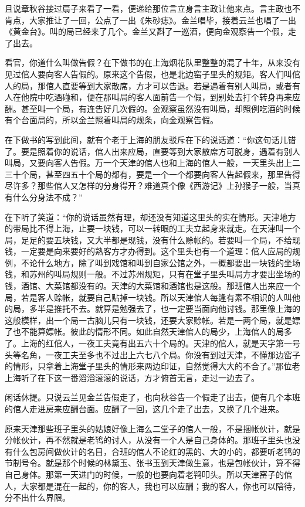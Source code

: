 \documentclass[12pt,UTF8]{ctexbook}
\begin{document}
{{{且说章秋谷接过扇子来看了一看，便递给那位言立身言主政让他来点。言主政也不肯点，大家推让了一回，公点了一出《朱砂痣》。金兰唱毕，接着云兰也唱了一出《黄金台》。叫的局已经来了几个。金兰又斟了一巡酒，便向金观察告一个假，走了出去。

看官，你道什么叫做告假？在下做书的在上海烟花队里整整的混了十年，从来没有见过倌人要向客人告假的。原来这个告假，也是北边窑子里头的规矩。客人们叫倌人的局，那倌人直要等到大家散席，方才可以告退。若是遇着有别人叫局，或者有人在他院中吃酒碰和，便在那叫局的客人面前告一个假，到别处去打个转身再来应酬。甚至叫一个局，有连告好几次假的。金观察虽然没有叫局，却照例吃酒的时候有个台面局的，所以金兰照着叫局的规条，向金观察告假。

在下做书的写到此间，就有个老于上海的朋友驳斥在下的说话道：“你这句话儿错了。要是照着你的说话，倌人出来应局，直要等到大家散席方可脱身，遇着有别人叫局，又要向客人告假。万一个天津的倌人也和上海的倌人一般，一天里头出上二三十个局，甚至四五十个局的都有，要是一个一个都要向客人告起假来，那里告得尽许多？那些倌人又怎样的分身得开？难道真个像《西游记》上孙猴子一般，当真有什么分身法不成？”

在下听了笑道：“你的说话虽然有理，却还没有知道这里头的实在情形。天津地方的带局比不得上海，止要一块钱，可以一转眼的工夫立起身来就走。在天津叫一个局，足足的要五块钱，又大半都是现钱，没有什么赊帐的。若要叫一个局，不给现钱，一定要是向来要好的熟客方才办得到。这个里头也有一个道理：倌人应局的规例，不论什么地方，除了叫到戏馆和叫到自家公馆之外，一概都要出一块钱的坐场钱，和苏州的叫局规则一般。不过苏州规矩，只有在堂子里头叫局方才要出坐场的钱，酒馆、大菜馆都没有的。天津的大菜馆和酒馆也是这般。那班倌人出来应一个局，若是客人赊帐，就要自己贴掉一块钱。所以天津倌人每逢有素不相识的人叫他的局，多半是推托不去。就算是勉强去了，也一定要当面向他讨钱。那里像上海的这般模样，出一个局一古脑儿只有一块钱，还要大家赊帐。若是一两个局，就是嫖了也不能算嫖帐。彼此的情形不同。如此自然天津倌人的局少，上海倌人的局多了。上海的红倌人，一夜工夫竟有出五六十个局的。天津的倌人，就是天字第一号头等名角，一夜工夫至多也不过出上六七八个局。你没有到过天津，不懂那边窑子的情形，只拿着上海堂子里头的情形来两边印证，自然觉得大大的不合了。”那位老上海听了在下这一番滔滔滚滚的说话，方才俯首无言，走过一边去了。

闲话休提。只说云兰见金兰告假走了，也向秋谷告一个假走了出去，便有几个本班的倌人走进房来应酬台面。应酬了一回，这几个走了出去，又换了几个进来。

原来天津那些班子里头的姑娘好像上海么二堂子的倌人一般，不是捆帐伙计，就是分帐伙计，再不然就是老鸨的讨人，从没有一个人是自己身体的。那班子里头也没有什么包房间做伙计的名目，合班的倌人不论红的黑的、大的小的，都要听老鸨的节制号令。就是那个时候的林黛玉、张书玉到天津做生意，也是包帐伙计，算不得自己身体。那第一天进门的时候，一般的也要向着老鸨叩头。所以天津窑子的倌人，大家都是混在一起的，你的客人，我也可以应酬；我的客人，你也可以陪待，分不出什么界限。

}}}
\end{document}
